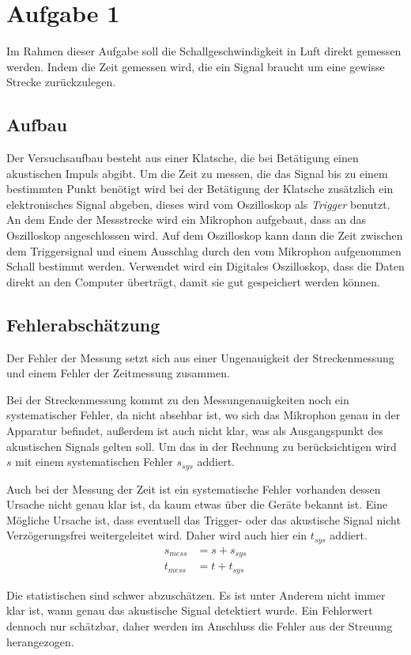 \section{Aufgabe 1}
Im Rahmen dieser Aufgabe soll die Schallgeschwindigkeit in Luft direkt gemessen werden. Indem die Zeit gemessen wird, die ein Signal braucht um eine gewisse Strecke zurückzulegen.
\subsection{Aufbau}
Der Versuchsaufbau besteht aus einer Klatsche, die bei Betätigung einen akustischen Impuls abgibt. Um die Zeit zu messen, die das Signal bis zu einem bestimmten Punkt benötigt wird bei der Betätigung der Klatsche zusätzlich ein elektronisches Signal abgeben, dieses wird vom Oszilloskop als \textit{Trigger} benutzt. An dem Ende der Messstrecke wird ein Mikrophon aufgebaut, dass an das Oszilloskop angeschlossen wird. Auf dem Oszilloskop kann dann die Zeit zwischen dem Triggersignal und einem Ausschlag durch den vom Mikrophon aufgenommen Schall bestimmt werden. Verwendet wird ein Digitales Oszilloskop, dass die Daten direkt an den Computer überträgt, damit sie gut gespeichert werden können.
\subsection{Fehlerabschätzung}
Der Fehler der Messung setzt sich aus einer Ungenauigkeit der Streckenmessung und einem Fehler der Zeitmessung zusammen. 

Bei der Streckenmessung kommt zu den Messungenauigkeiten noch ein systematischer Fehler, da nicht absehbar ist, wo sich das Mikrophon genau in der Apparatur befindet, außerdem ist auch nicht klar, was als Ausgangspunkt des akustischen Signals gelten soll. Um das in der Rechnung zu berücksichtigen wird \(s\) mit einem systematischen Fehler \(s_{sys}\) addiert.

Auch bei der Messung der Zeit ist ein systematische Fehler vorhanden dessen Ursache nicht genau klar ist, da kaum etwas über die Geräte bekannt ist. Eine Mögliche Ursache ist, dass eventuell das Trigger- oder das akustische Signal nicht Verzögerungsfrei weitergeleitet wird. Daher wird auch hier ein \(t_{sys}\) addiert.
\begin{align}
s_{mess} &= s + s_{sys}\\
t_{mess} &= t + t_{sys}
\end{align}

Die statistischen sind schwer abzuschätzen. Es ist unter Anderem nicht immer klar ist, wann genau das akustische Signal detektiert wurde. Ein Fehlerwert dennoch nur schätzbar, daher werden im Anschluss die Fehler aus der Streuung herangezogen. 

